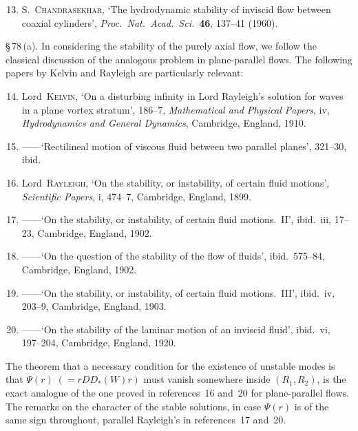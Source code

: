 \begin{enumerate}\setcounter{enumi}{12}
\item S.~\textsc{Chandrasekhar}, `The hydrodynamic stability of inviscid flow between coaxial cylinders', \emph{Proc.\ Nat.\ Acad.\ Sci.}\ \textbf{46}, 137--41 (1960).
\end{enumerate}

\noindent \S\,78\,(a). In considering the stability of the purely axial flow, we follow the classical discussion of the analogous problem in plane-parallel flows. The following papers by Kelvin and Rayleigh are particularly relevant:

\begin{enumerate}\setcounter{enumi}{13}
\item Lord~\textsc{Kelvin}, `On a disturbing infinity in Lord Rayleigh's solution for waves in a plane vortex stratum', 186--7, \emph{Mathematical and Physical Papers}, iv, \emph{Hydrodynamics and General Dynamics}, Cambridge, England, 1910.

\item ------\quad `Rectilineal motion of viscous fluid between two parallel planes', 321--30, ibid.

\item Lord~\textsc{Rayleigh}, `On the stability, or instability, of certain fluid motions', \emph{Scientific Papers}, i, 474--7, Cambridge, England, 1899.

\item ------\quad `On the stability, or instability, of certain fluid motions.\ II', ibid.\ iii, 17--23, Cambridge, England, 1902.

\item ------\quad `On the question of the stability of the flow of fluids', ibid.\ 575--84, Cambridge, England, 1902.

\item ------\quad `On the stability, or instability, of certain fluid motions.\ III', ibid.\ iv, 203--9, Cambridge, England, 1903.

\item ------\quad `On the stability of the laminar motion of an inviscid fluid', ibid.\ vi, 197--204, Cambridge, England, 1920.
\end{enumerate}

\noindent The theorem that a necessary condition for the existence of unstable modes is that $\Psi(r)\;(= rDD_*(W)r)$ must vanish somewhere inside $(R_1,R_2)$, is the exact analogue of the one proved in references~16 and~20 for plane-parallel flows. The remarks on the character of the stable solutions, in case $\Psi(r)$ is of the same sign throughout, parallel Rayleigh's in references~17 and~20.

